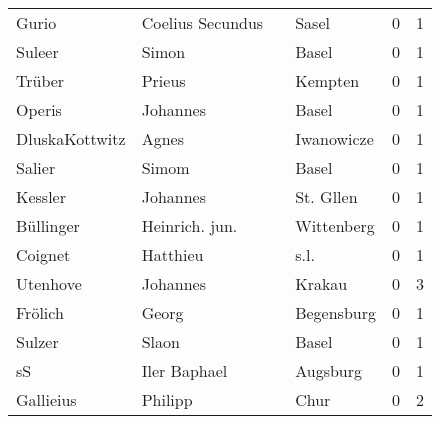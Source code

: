 \begin{tabular}{llllrr}
                    Gurio &                   Coelius Secundus &             &                                       Sasel &          0 &         1 \\
                   Suleer &                              Simon &             &                                       Basel &          0 &         1 \\
                   Trüber &                             Prieus &             &                                     Kempten &          0 &         1 \\
                   Operis &                           Johannes &             &                                       Basel &          0 &         1 \\
           DluskaKottwitz &                              Agnes &             &                                  Iwanowicze &          0 &         1 \\
                   Salier &                              Simom &             &                                       Basel &          0 &         1 \\
                  Kessler &                           Johannes &             &                                   St. Gllen &          0 &         1 \\
                Büllinger &                     Heinrich. jun. &             &                                  Wittenberg &          0 &         1 \\
                  Coignet &                           Hatthieu &             &                                        s.l. &          0 &         1 \\
                 Utenhove &                           Johannes &             &                                      Krakau &          0 &         3 \\
                  Frölich &                              Georg &             &                                  Begensburg &          0 &         1 \\
                   Sulzer &                              Slaon &             &                                       Basel &          0 &         1 \\
                       sS &                       Iler Baphael &             &                                    Augsburg &          0 &         1 \\
                Gallieius &                            Philipp &             &                                        Chur &          0 &         2 \\

\end{tabular}
